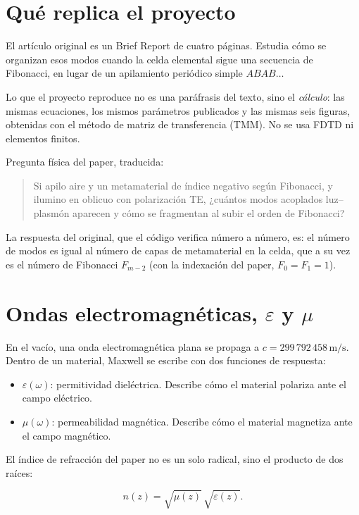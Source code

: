 \documentclass[11pt,a4paper]{article}
\begin{document}
\section{Qué replica el proyecto}

El artículo original es un Brief Report de cuatro páginas.
Estudia cómo se organizan esos modos cuando la celda elemental sigue una
secuencia de Fibonacci, en lugar de un apilamiento periódico simple \(ABAB\ldots\)

Lo que el proyecto reproduce no es una paráfrasis del texto, sino el
\emph{cálculo}: las mismas ecuaciones, los mismos parámetros publicados y las
mismas seis figuras, obtenidas con el método de matriz de transferencia (TMM).
No se usa FDTD ni elementos finitos.

Pregunta física del paper, traducida:

\begin{quote}
Si apilo aire y un metamaterial de índice negativo según Fibonacci, y ilumino
en oblicuo con polarización TE, ¿cuántos modos acoplados luz--plasmón aparecen
y cómo se fragmentan al subir el orden de Fibonacci?
\end{quote}

La respuesta del original, que el código verifica número a número, es:
el número de modos es igual al número de capas de metamaterial en la celda,
que a su vez es el número de Fibonacci \(F_{m-2}\) (con la indexación del
paper, \(F_0=F_1=1\)).

\section{Ondas electromagnéticas, \(\varepsilon\) y \(\mu\)}

En el vacío, una onda electromagnética plana se propaga a
\(c=299\,792\,458\,\mathrm{m/s}\). Dentro de un material, Maxwell se escribe
con dos funciones de respuesta:

\begin{itemize}
\item \(\varepsilon(\omega)\): permitividad dieléctrica. Describe cómo el
material polariza ante el campo eléctrico.
\item \(\mu(\omega)\): permeabilidad magnética. Describe cómo el material
magnetiza ante el campo magnético.
\end{itemize}

El índice de refracción del paper no es un solo radical, sino el producto de
dos raíces:

\begin{equation}
n(z)=\sqrt{\mu(z)}\,\sqrt{\varepsilon(z)}.
\end{equation}
\end{document}
